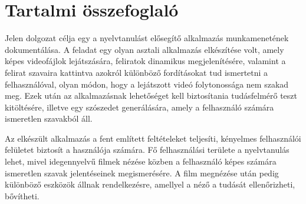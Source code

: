 \chapter*{Tartalmi összefoglaló}

Jelen dolgozat célja egy a nyelvtanulást elősegítő alkalmazás munkamenetének dokumentálása. A feladat egy olyan asztali alkalmazás elkészítése volt, amely képes videofájlok lejátszására, feliratok dinamikus megjelenítésére, valamint a felirat szavaira kattintva azokról különböző fordításokat tud ismertetni a felhasználóval, olyan módon, hogy a lejátszott videó folytonossága nem szakad meg. Ezek után az alkalmazásnak lehetőséget kell biztosítania tudásfelmérő teszt kitöltésére, illetve egy szószedet generálására, amely a felhasználó számára ismeretlen szavakból áll. 

Az elkészült alkalmazás a fent említett feltételeket teljesíti, kényelmes felhasználói felületet biztosít a használója számára. Fő felhasználási területe a nyelvtanulás lehet, mivel idegennyelvű filmek nézése közben a felhasználó képes számára ismeretlen szavak jelentéseinek megismerésére. A film megnézése után pedig különböző eszközök állnak rendelkezésre, amellyel a néző a tudását ellenőrizheti, bővítheti.